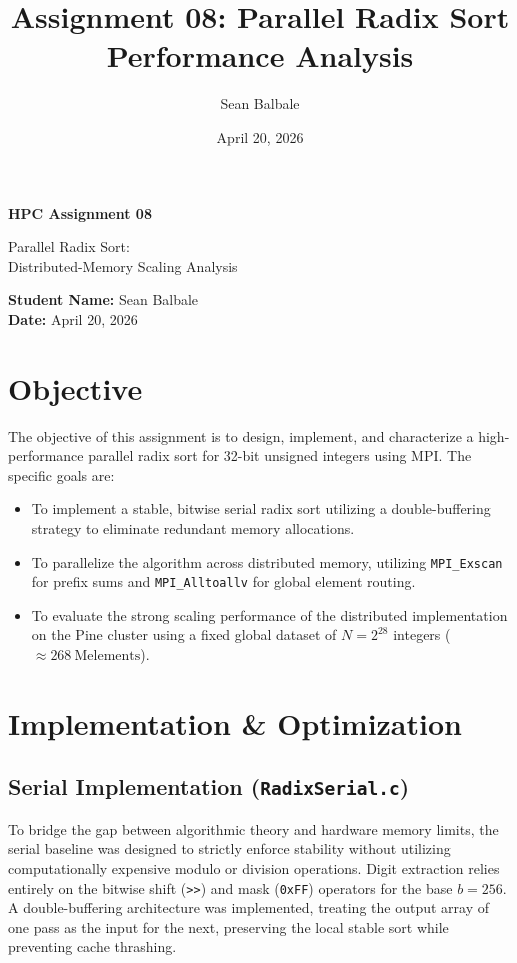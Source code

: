 \documentclass[11pt]{article}
\title{\textbf{Assignment 08: Parallel Radix Sort Performance Analysis}}
\author{Sean Balbale}
\date{April 20, 2026}
\begin{document}
\begin{titlepage}
  \begin{center}
    \vspace*{1in}

    \Huge
    \textbf{HPC Assignment 08}

    \LARGE
    Parallel Radix Sort: \\ Distributed-Memory Scaling Analysis

    \vspace{3in}

    \textbf{Student Name:} Sean Balbale
    \\ \textbf{Date:} April 20, 2026

    \vfill

  \end{center}
\end{titlepage}

\newpage

\section{Objective}
The objective of this assignment is to design, implement, and characterize a high-performance parallel radix sort for 32-bit unsigned integers using MPI. The specific goals are:
\begin{itemize}
  \item To implement a stable, bitwise serial radix sort utilizing a double-buffering strategy to eliminate redundant memory allocations.
  \item To parallelize the algorithm across distributed memory, utilizing \texttt{MPI\_Exscan} for prefix sums and \texttt{MPI\_Alltoallv} for global element routing.
  \item To evaluate the strong scaling performance of the distributed implementation on the Pine cluster using a fixed global dataset of $N = 2^{28}$ integers ($\approx \SI{268}{\mega\text{elements}}$).
\end{itemize}

\section{Implementation \& Optimization}

\subsection{Serial Implementation (\texttt{RadixSerial.c})}
To bridge the gap between algorithmic theory and hardware memory limits, the serial baseline was designed to strictly enforce stability without utilizing computationally expensive modulo or division operations. Digit extraction relies entirely on the bitwise shift (\texttt{>>}) and mask (\texttt{0xFF}) operators for the base $b=256$. A double-buffering architecture was implemented, treating the output array of one pass as the input for the next, preserving the local stable sort while preventing cache thrashing.
\end{document}
